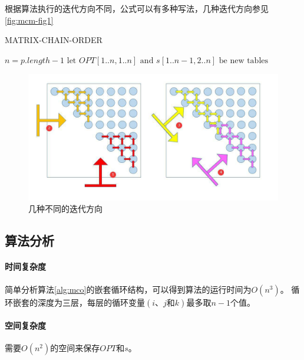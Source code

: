 \begin{remark}
  根据算法执行的迭代方向不同，公式可以有多种写法，几种迭代方向参见\autoref{fig:mcm-fig1}
\end{remark}

\begin{algorithm}
  \caption{MATRIX-CHAIN-ORDER}\label{alg:mco}
  \BlankLine
  $n = p.length-1$\;
  $\text{let } OPT[1..n, 1..n] \text{ and } s[1..n-1, 2..n] \text{ be new tables}$\;
\end{algorithm}

\begin{figure}[hbt!]
  \centering
  \includegraphics[scale=0.6]{image/dynamic-programming-1.png}
  \caption{几种不同的迭代方向}\label{fig:mcm-fig1}
\end{figure}

\subsection{算法分析}
\paragraph*{时间复杂度}
简单分析算法\ref{alg:mco}的嵌套循环结构，可以得到算法的运行时间为$O(n^3)$。
循环嵌套的深度为三层，每层的循环变量$(i\text{、}j\text{和}k)$最多取$n-1$个值。
\paragraph*{空间复杂度}
需要$O(n^2)$的空间来保存$OPT$和$s$。